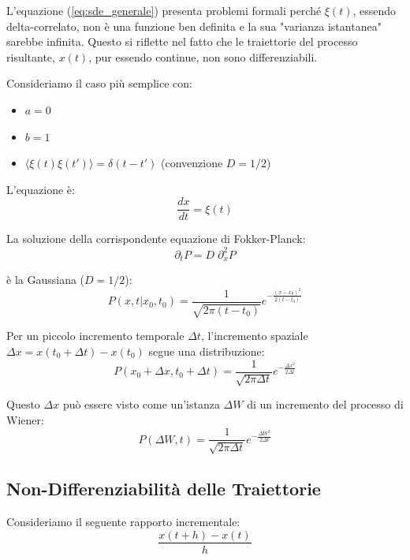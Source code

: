 \begin{tcolorbox}[colback=colorF!5,colframe=colorF,title=\textbf{!! Attenzione !!}, fonttitle=\bfseries\sffamily, arc=3mm, boxrule=1.2pt]
L'equazione (\ref{eq:sde_generale}) presenta problemi formali perché $\xi(t)$, essendo delta-correlato, non è una funzione ben definita e la sua "varianza istantanea" sarebbe infinita. Questo si riflette nel fatto che le traiettorie del processo risultante, $x(t)$, pur essendo continue, non sono differenziabili.
\end{tcolorbox}

Consideriamo il caso più semplice con:
\begin{itemize}
    \item $a=0$
    \item $b=1$
    \item $\langle \xi(t)\xi(t') \rangle = \delta(t-t')$ (convenzione $D=1/2$)
\end{itemize}

L'equazione è:
\begin{equation} 
\frac{dx}{dt} = \xi(t) 
\end{equation}

La soluzione della corrispondente equazione di Fokker-Planck:
\begin{equation}  
\partial_t P =D \; \partial_x^2 P
\end{equation}

è la Gaussiana ($D=1/2$):
\begin{equation}
P(x, t | x_0, t_0) = \frac{1}{\sqrt{2\pi (t-t_0)}} e^{-\frac{(x-x_0)^2}{2(t-t_0)}}
\end{equation}

Per un piccolo incremento temporale $\Delta t$, l'incremento spaziale $\Delta x = x(t_0+\Delta t) - x(t_0)$ segue una distribuzione:
\begin{equation}
P(x_0 +\Delta x, t_0+\Delta t) = \frac{1}{\sqrt{2\pi \Delta t}} e^{-\frac{\Delta x^2}{2\Delta t}}
\end{equation}

Questo $\Delta x$ può essere visto come un'istanza $\Delta W$ di un incremento del processo di Wiener:
\begin{equation}
P(\Delta W,  t) = \frac{1}{\sqrt{2\pi \Delta t}} e^{-\frac{\Delta W^2}{2\Delta t}}
\end{equation}

\subsection{Non-Differenziabilità delle Traiettorie}
Consideriamo il seguente rapporto incrementale:
\begin{equation} 
\frac{x(t+h) - x(t)}{h} 
\end{equation}

